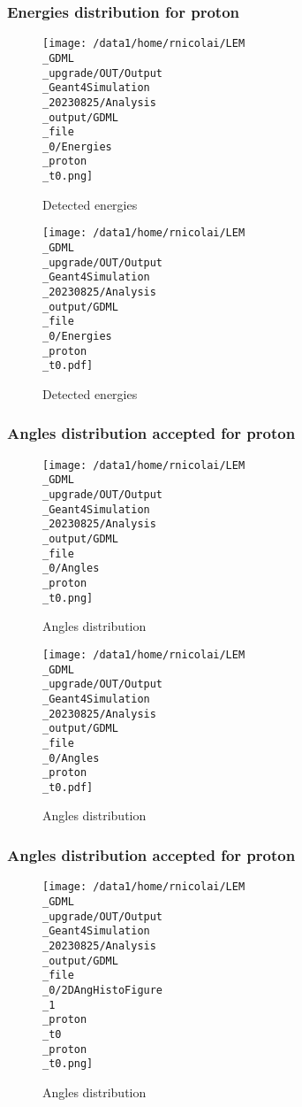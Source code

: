 \documentclass[8pt]{beamer}
\begin{document}
            \begin{frame}
                \frametitle{Energies distribution for proton}
            
        \begin{figure}[h]
            \centering
            \texttt{[image: /data1/home/rnicolai/LEM\\\_GDML\\\_upgrade/OUT/Output\\\_Geant4Simulation\\\_20230825/Analysis\\\_output/GDML\\\_file\\\_0/Energies\\\_proton\\\_t0.png]}
            \caption{Detected energies}
        \end{figure}
        
        \begin{figure}[h]
            \centering
            \texttt{[image: /data1/home/rnicolai/LEM\\\_GDML\\\_upgrade/OUT/Output\\\_Geant4Simulation\\\_20230825/Analysis\\\_output/GDML\\\_file\\\_0/Energies\\\_proton\\\_t0.pdf]}
            \caption{Detected energies}
        \end{figure}
        
            \end{frame}
            
            \begin{frame}
                \frametitle{Angles distribution accepted for proton}
            
        \begin{figure}[h]
            \centering
            \texttt{[image: /data1/home/rnicolai/LEM\\\_GDML\\\_upgrade/OUT/Output\\\_Geant4Simulation\\\_20230825/Analysis\\\_output/GDML\\\_file\\\_0/Angles\\\_proton\\\_t0.png]}
            \caption{Angles distribution}
        \end{figure}
        
        \begin{figure}[h]
            \centering
            \texttt{[image: /data1/home/rnicolai/LEM\\\_GDML\\\_upgrade/OUT/Output\\\_Geant4Simulation\\\_20230825/Analysis\\\_output/GDML\\\_file\\\_0/Angles\\\_proton\\\_t0.pdf]}
            \caption{Angles distribution}
        \end{figure}
        
            \end{frame}
            
            \begin{frame}
                \frametitle{Angles distribution accepted for proton}
            
        \begin{figure}[h]
            \centering
            \texttt{[image: /data1/home/rnicolai/LEM\\\_GDML\\\_upgrade/OUT/Output\\\_Geant4Simulation\\\_20230825/Analysis\\\_output/GDML\\\_file\\\_0/2DAngHistoFigure\\\_1\\\_proton\\\_t0\\\_proton\\\_t0.png]}
            \caption{Angles distribution}
        \end{figure}
        
            \end{frame}
            
\end{document}
